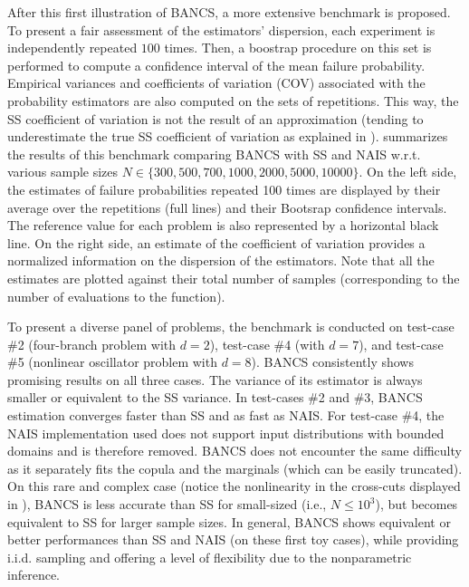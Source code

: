 After this first illustration of BANCS, a more extensive benchmark is proposed. 
To present a fair assessment of the estimators' dispersion, each experiment is independently repeated $100$ times. 
Then, a boostrap procedure on this set is performed to compute a confidence interval of the mean failure probability. 
Empirical variances and coefficients of variation (COV) associated with the probability estimators are also computed on the sets of repetitions. 
This way, the SS coefficient of variation is not the result of an approximation (tending to underestimate the true SS coefficient of variation as explained in \citealp{Papaioannou_PEM_2015}).
 summarizes the results of this benchmark comparing BANCS with SS and NAIS w.r.t. various sample sizes $N \in \{300, 500, 700, 1000, 2000, 5000, 10000\}$.  
On the left side, the estimates of failure probabilities repeated 100 times are displayed by their average over the repetitions (full lines) and their Bootsrap confidence intervals. 
The reference value for each problem is also represented by a horizontal black line. 
On the right side, an estimate of the coefficient of variation provides a normalized information on the dispersion of the estimators.  
Note that all the estimates are plotted against their total number of samples (corresponding to the number of evaluations to the function). 

To present a diverse panel of problems, the benchmark is conducted on test-case \#2 (four-branch problem with $d=2$), test-case \#4 (with $d=7$), and test-case \#5 (nonlinear oscillator problem with $d=8$). 
BANCS consistently shows promising results on all three cases. 
The variance of its estimator is always smaller or equivalent to the SS variance. 
In test-cases \#2 and \#3, BANCS estimation converges faster than SS and as fast as NAIS. 
For test-case \#4, the NAIS implementation used does not support input distributions with bounded domains and is therefore removed. 
BANCS does not encounter the same difficulty as it separately fits the copula and the marginals (which can be easily truncated). 
On this rare and complex case (notice the nonlinearity in the cross-cuts displayed in ), BANCS is less accurate than SS for small-sized (i.e., $N\leq 10^3$), but becomes equivalent to SS for larger sample sizes.
In general, BANCS shows equivalent or better performances than SS and NAIS (on these first toy cases), while providing i.i.d. sampling and offering a level of flexibility due to the nonparametric inference. 

